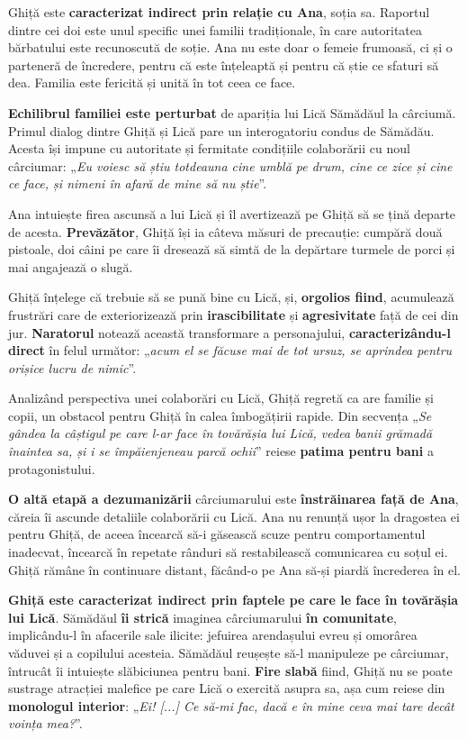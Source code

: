 \documentclass{article}
\newcommand{\qu}[1]{„\emph{#1}”}
\begin{document}
Ghiță este \textbf{caracterizat indirect prin relație cu Ana}, soția sa. Raportul dintre cei doi este unul specific unei familii tradiționale, în care autoritatea bărbatului este recunoscută de soție. Ana nu este doar o femeie frumoasă, ci și o parteneră de încredere, pentru că este înțeleaptă și pentru că știe ce sfaturi să dea. Familia este fericită și unită în tot ceea ce face.

\textbf{Echilibrul familiei este perturbat} de apariția lui Lică Sămădăul la cârciumă. Primul dialog dintre Ghiță și Lică pare un interogatoriu condus de Sămădău. Acesta își impune cu autoritate și fermitate condițiile colaborării cu noul cârciumar: \qu{Eu voiesc să știu totdeauna cine umblă pe drum, cine ce zice și cine ce face, și nimeni în afară de mine să nu știe}.

Ana intuiește firea ascunsă a lui Lică și îl avertizează pe Ghiță să se țină departe de acesta. \textbf{Prevăzător}, Ghiță își ia câteva măsuri de precauție: cumpără două pistoale, doi câini pe care îi dresează să simtă de la depărtare turmele de porci și mai angajează o slugă.

Ghiță înțelege că trebuie să se pună bine cu Lică, și, \textbf{orgolios fiind}, acumulează frustrări care de exteriorizează prin \textbf{irascibilitate} și \textbf{agresivitate} față de cei din jur. \textbf{Naratorul} notează această transformare a personajului, \textbf{caracterizându-l direct} în felul următor: \qu{acum el se făcuse mai de tot ursuz, se aprindea pentru orișice lucru de nimic}.

Analizând perspectiva unei colaborări cu Lică, Ghiță regretă ca are familie și copii, un obstacol pentru Ghiță în calea îmbogățirii rapide. Din secvența \qu{Se gândea la câștigul pe care l-ar face în tovărășia lui Lică, vedea banii grămadă înaintea sa, și i se împăienjeneau parcă ochii} reiese \textbf{patima pentru bani} a protagonistului.

\textbf{O altă etapă a dezumanizării} cârciumarului este \textbf{înstrăinarea față de Ana}, căreia îi ascunde detaliile colaborării cu Lică. Ana nu renunță ușor la dragostea ei pentru Ghiță, de aceea încearcă să-i găsească scuze pentru comportamentul inadecvat, încearcă în repetate rânduri să restabilească comunicarea cu soțul ei. Ghiță rămâne în continuare distant, făcând-o pe Ana să-și piardă încrederea în el.

\textbf{Ghiță este caracterizat indirect prin faptele pe care le face în tovărășia lui Lică}. Sămădăul \textbf{îi strică} imaginea cârciumarului \textbf{în comunitate}, implicându-l în afacerile sale ilicite: jefuirea arendașului evreu și omorârea văduvei și a copilului acesteia. Sămădăul reușește să-l manipuleze pe cârciumar, întrucât îi intuiește slăbiciunea pentru bani. \textbf{Fire slabă} fiind, Ghiță nu se poate sustrage atracției malefice pe care Lică o exercită asupra sa, așa cum reiese din \textbf{monologul interior}: \qu{Ei! [...] Ce să-mi fac, dacă e în mine ceva mai tare decât voința mea?}.
\end{document}
